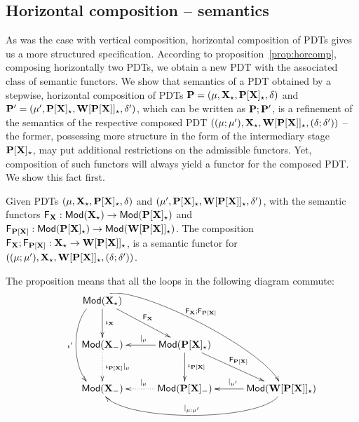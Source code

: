 \subsection{Horizontal composition -- semantics}\label{sub:hcsem}
As was the case with vertical composition, horizontal composition of PDTs
gives us a more structured specification. 
According to
proposition~\ref{prop:horcomp}, composing horizontally two PDTs, we obtain a
new PDT with the associated class of semantic functors. 
We show that semantics of a PDT obtained by a stepwise, horizontal
composition of PDTs $\thr P=\pdt$ and $\thr
P'=\pdtsp{\mu'}{\delta'}{\thr{P[X]_\cons}}{\thr{W[P[X]]_\cons}}$, 
which can be written as $\thr P;\thr P'$, 
is a
refinement of the semantics of the respective composed PDT 
$\pdtsp{(\mu;\mu')}{(\delta;\delta')}{\thr{X_\cons}}{\thr{W[P[X]]_\cons}}$ --
the former, possessing more structure in the form of the intermediary stage
$\thr{P[X]_\cons}$, may put additional restrictions on the admissible
functors. Yet, composition of such functors will always yield a functor for
the composed PDT.
We show this fact first.
\begin{proposition}
Given PDTs $\pdt$ and
$\pdtsp{\mu'}{\delta'}{\thr{P[X]_\cons}}{\thr{W[P[X]]_\cons}}$, 
with the semantic functors
$\fu{F_\thr{X}}: \Mod(\thr{X_\cons}) \to 
\Mod(\thr{P[X]_\cons})$ and $\fu{F_\thr{P[X]}}: \Mod(\thr{P[X]_\cons}) \to
\Mod(\thr{W[P[X]]_\cons})$. The composition
$\comp{\fu{F_\thr{X}}}{\fu{F_\thr{P[X]}}}:\thr{X_\cons} \to
\thr{W[P[X]]_\cons}$, is a semantic functor for
$\pdtsp{(\mu;\mu')}{(\delta;\delta')}{\thr{X_\cons}}{\thr{W[P[X]]_\cons}}$. 
\end{proposition} 
The proposition means that all the loops in the following diagram commute:
\[
\xymatrix@C=0.4cm@R=0.4cm{
&& \Mod(\thr{X_\cons}) \ar[dd]^{\iota_{\thr{X}}}
\ar@(l,l)[dddd]_{\iota'} \ar[rrdd]^{\fu{F_\thr{X}}}
\ar@(u,u)[rrrrdddd]^{\comp{\fu{F_\thr{X}}}{\fu{F_\thr{P[X]}}}}\\ 
\\
&& \Mod(\thr{X_{\weak}}) \ar@{.>}[dd]^{\iota_{\thr{P[X]}}|_\mu}
&& \Mod(\thr{P[X]_\cons}) \ar[ll]_{|_{\mu}} \ar[dd]^{\iota_{\thr{P[X]}}} \ar[rrdd]^{\fu{F_\thr{P[X]}}}\\
\\
&&\Mod(\thr{X_{\weak}})
&& \Mod(\thr{P[X]_{\weak}}) \ar@{.>}[ll]_{|_{\mu}}
&& \Mod(\thr{W[P[X]]_\cons}) \ar[ll]_{|_{\mu'}} \ar@(d,d)[llll]_{|_{\comp{\mu}{\mu'}}}\\
\\
}
\]
